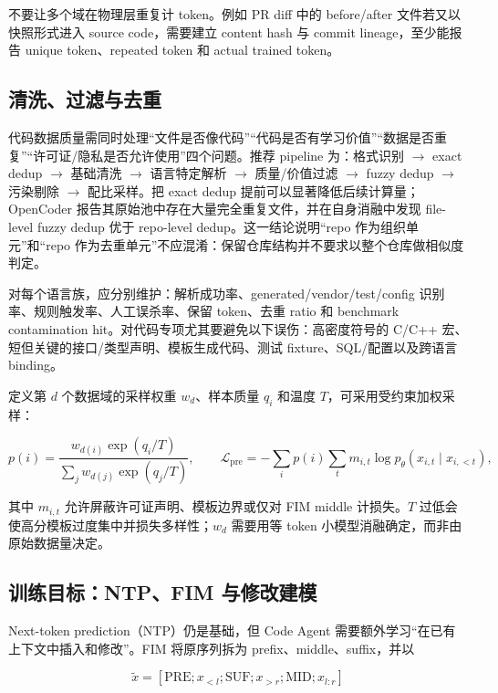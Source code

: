 \documentclass[10pt,a4paper,UTF8,fontset=none]{ctexart}
\begin{document}
不要让多个域在物理层重复计 token。例如 PR diff 中的 before/after 文件若又以快照形式进入 source code，需要建立 content hash 与 commit lineage，至少能报告 unique token、repeated token 和 actual trained token。

\subsection{清洗、过滤与去重}

代码数据质量需同时处理“文件是否像代码”“代码是否有学习价值”“数据是否重复”“许可证/隐私是否允许使用”四个问题。推荐 pipeline 为：格式识别 $\rightarrow$ exact dedup $\rightarrow$ 基础清洗 $\rightarrow$ 语言特定解析 $\rightarrow$ 质量/价值过滤 $\rightarrow$ fuzzy dedup $\rightarrow$ 污染剔除 $\rightarrow$ 配比采样。把 exact dedup 提前可以显著降低后续计算量；OpenCoder 报告其原始池中存在大量完全重复文件，并在自身消融中发现 file-level fuzzy dedup 优于 repo-level dedup\cite{zh:huang2024opencoder}。这一结论说明“repo 作为组织单元”和“repo 作为去重单元”不应混淆：保留仓库结构并不要求以整个仓库做相似度判定。

对每个语言族，应分别维护：解析成功率、generated/vendor/test/config 识别率、规则触发率、人工误杀率、保留 token、去重 ratio 和 benchmark contamination hit。对代码专项尤其要避免以下误伤：高密度符号的 C/C++ 宏、短但关键的接口/类型声明、模板生成代码、测试 fixture、SQL/配置以及跨语言 binding。

定义第 $d$ 个数据域的采样权重 $w_d$、样本质量 $q_i$ 和温度 $T$，可采用受约束加权采样：

\begin{equation}
p(i)=\frac{w_{d(i)}\exp(q_i/T)}{\sum_j w_{d(j)}\exp(q_j/T)},
\qquad
\mathcal{L}_{\mathrm{pre}}=-\sum_i p(i)\sum_t m_{i,t}\log p_\theta(x_{i,t}\mid x_{i,<t}),
\label{zh:eq:pretrain}
\end{equation}

其中 $m_{i,t}$ 允许屏蔽许可证声明、模板边界或仅对 FIM middle 计损失。$T$ 过低会使高分模板过度集中并损失多样性；$w_d$ 需要用等 token 小模型消融确定，而非由原始数据量决定。

\subsection{训练目标：NTP、FIM 与修改建模}

Next-token prediction（NTP）仍是基础，但 Code Agent 需要额外学习“在已有上下文中插入和修改”。FIM 将原序列拆为 prefix、middle、suffix，并以

\begin{equation}
\tilde{x}=[\mathrm{PRE};x_{<l};\mathrm{SUF};x_{>r};\mathrm{MID};x_{l:r}]
\label{zh:eq:fim}
\end{equation}
\end{document}
